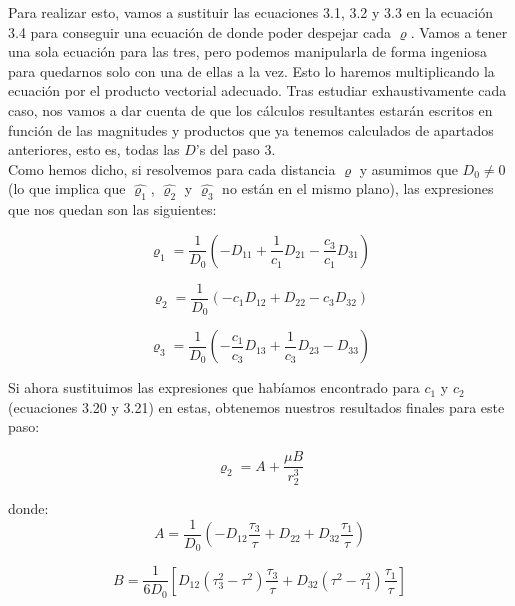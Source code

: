 \documentclass{article}
\numberwithin{equation}{section}
\begin{document}
Para realizar esto, vamos a sustituir las ecuaciones 3.1, 3.2 y 3.3 en la ecuación 3.4 para conseguir una ecuación de donde poder despejar cada $\varrho$. Vamos a tener una sola ecuación para las tres, pero podemos manipularla de forma ingeniosa para quedarnos solo con una de ellas a la vez. Esto lo haremos multiplicando la ecuación por el producto vectorial adecuado. Tras estudiar exhaustivamente cada caso, nos vamos a dar cuenta de que los cálculos resultantes estarán escritos en función de las magnitudes y productos que ya tenemos calculados de apartados anteriores, esto es, todas las $D$'s del paso 3.\\

Como hemos dicho, si resolvemos para cada distancia $\varrho$ y asumimos que $\mbox{$D_0 \neq 0$}$ (lo que implica que $\hat{\varrho_1}$, $\hat{\varrho_2}$ y $\hat{\varrho_3}$ no están en el mismo plano), las expresiones que nos quedan son las siguientes:

\begin{equation}
\varrho_1 = \frac{1}{D_0} \left( -D_{11} + \frac{1}{c_1} D_{21} - \frac{c_3}{c_1} D_{31} \right)
\end{equation}

\begin{equation}
\varrho_2 = \frac{1}{D_0} (-c_1 D_{12} + D_{22} - c_3 D_{32})
\end{equation}

\begin{equation}
\varrho_3 = \frac{1}{D_0} \left( -\frac{c_1}{c_3} D_{13} + \frac{1}{c_3} D_{23} - D_{33} \right)
\end{equation}

Si ahora sustituimos las expresiones que habíamos encontrado para $c_1$ y $c_2$ (ecuaciones 3.20 y 3.21) en estas, obtenemos nuestros resultados finales para este paso:

\begin{equation}
    \varrho_2 = A + \frac{\mu B}{r_2^3}
\end{equation}

donde:
\begin{equation}
A = \frac{1}{D_0} \left( -D_{12} \frac{\tau_3}{\tau} + D_{22} + D_{32} \frac{\tau_1}{\tau} \right)
\end{equation}

\begin{equation}
B = \frac{1}{6D_0} \left[ D_{12} (\tau_3^2 - \tau^2) \frac{\tau_3}{\tau} + D_{32} (\tau^2 - \tau_1^2) \frac{\tau_1}{\tau} \right]
\end{equation}
\end{document}
